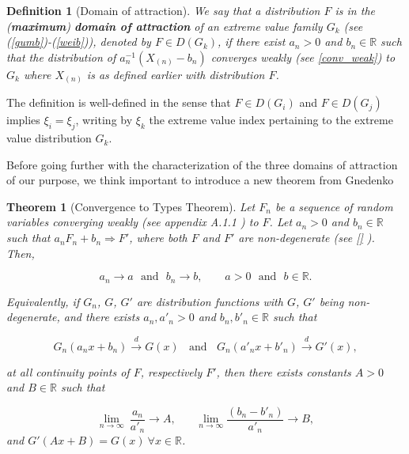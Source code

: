 \documentclass[11pt,a4paper,openany ]{book}
\newtheorem{theorem}{Theorem}[chapter]
\newtheorem{definition}{Definition}[chapter]
\begin{document}
\begin{definition}[Domain of attraction] We say that a distribution $F$ is in the (\emph{\textbf{maximum}}) \emph{\textbf{domain of attraction}} of an extreme value family $G_k$ \big(see (\ref{gumb})-(\ref{weib})\big), denoted by $F\in D(G_k)$, if there exist $a_n>0$ and $b_n\in\mathbb{R}$ such that the distribution
	of $a_n^{-1}(X_{(n)}-b_n)$ converges weakly (see \ref{conv_weak}) to $G_k$ where $X_{(n)}$ is as defined earlier with distribution $F$.
\end{definition}
The definition is well-defined in the sense that $F\in D(G_i)$ and $F\in D(G_j)$ implies $\xi_i=\xi_j$, writing by $\xi_k$ the extreme value index pertaining to the extreme value distribution $G_k$.

Before going further with the characterization of the three domains of attraction of our purpose, we think important to introduce a new theorem from Gnedenko \cite{gnedenko_sur la distribution_translated_1992}

\begin{theorem}[Convergence to Types Theorem]
	Let $F_n$ be a sequence of random variables converging weakly (see appendix A.1.1 ) to $F$. Let $a_n>0$ and $b_n\in \mathbb{R}$ such that $a_nF_n+b_n\Rightarrow F'$, where both $F$ and $F'$ are non-degenerate (see \ref{} ). Then, 
	
	\begin{equation*}
	a_n\to a \ \ \ \text{and} \ \ \ b_n\to b, \ \ \ \ \ \ \ \ \ a>0 \ \ \ \text{and} \ \ \ b\in\mathbb{R}.
	\end{equation*}
	
	Equivalently, if $G_n$, $G$, $G'$ are distribution functions with $G$, $G'$ being non-degenerate, and there exists $a_n,a'_n>0$ and $b_n,b'_n\in\mathbb{R}$ such that
	
	\begin{equation*} G_n(a_nx+b_n)\stackrel{d}{\to} G(x) \ \ \ \ \text{and} \ \ \ \  G_n(a'_nx+b'_n)\stackrel{d}{\to} G'(x),
	\end{equation*}
	
	at all continuity points of $F$, respectively $F'$, then there exists constants $A>0$ and $B\in\mathbb{R}$ such that 
	
	\begin{equation*}
	\displaystyle{\lim_{n \to \infty}} \ \frac{a_n}{a'_n}\to A, \ \ \ \ \ \ \ \ \displaystyle{\lim_{n \to \infty}} \frac{(b_n-b'_n)}{a'_n}\to B,
	\end{equation*}
	and $G'(Ax+B)=G(x) \ \forall x\in\mathbb{R}$. 
\end{theorem}
\end{document}
